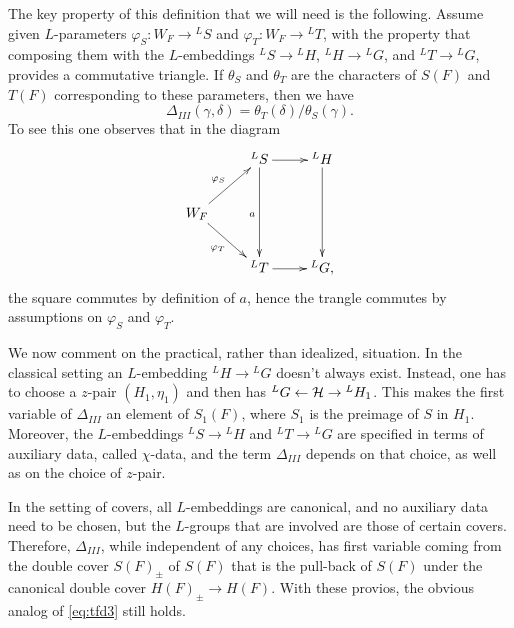 \documentclass{article}
\theoremstyle{definition}
\numberwithin{equation}{section}
\renewcommand{\-}{\hyp{}}
\begin{document}
The key property of this definition that we will need is the following. Assume given $L$\-parameters $\varphi_S : W_F \to {^LS}$ and $\varphi_T : W_F \to {^LT}$, with the property that composing them with the $L$\-embeddings $^LS \to {^LH}$, $^LH \to {^LG}$, and $^LT \to {^LG}$, provides a commutative triangle. If $\theta_S$ and $\theta_T$ are the characters of $S(F)$ and $T(F)$ corresponding to these parameters, then we have
\begin{equation} \label{eq:tfd3}
\Delta_{III}(\gamma,\delta) = \theta_T(\delta)/\theta_S(\gamma).	
\end{equation}
To see this one observes that in the diagram
\[ \xymatrix{
	&^LS\ar[dd]_a\ar[r]&^LH\ar[dd]\\
	W_F\ar[ru]^{\varphi_S}\ar[rd]_{\varphi_T}\\
	&^LT\ar[r]&^LG,
}
\]
the square commutes by definition of $a$, hence the trangle commutes by assumptions on $\varphi_S$ and $\varphi_T$.

We now comment on the practical, rather than idealized, situation. In the classical setting an $L$\-embedding $^LH \to {^LG}$ doesn't always exist. Instead, one has to choose a $z$-pair $(H_1,\eta_1)$ and then has $^LG \leftarrow \mathcal{H} \to {^LH_1}$. This makes the first variable of $\Delta_{III}$ an element of $S_1(F)$, where $S_1$ is the preimage of $S$ in $H_1$. Moreover, the $L$\-embeddings $^LS \to {^LH}$ and $^LT \to {^LG}$ are specified in terms of auxiliary data, called $\chi$-data, and the term $\Delta_{III}$ depends on that choice, as well as on the choice of $z$-pair.

In the setting of covers, all $L$\-embeddings are canonical, and no auxiliary data need to be chosen, but the $L$\-groups that are involved are those of certain covers. Therefore, $\Delta_{III}$, while independent of any choices, has first variable coming from the double cover $S(F)_\pm$ of $S(F)$ that is the pull-back of $S(F)$ under the canonical double cover $H(F)_\pm \to H(F)$. With these provios, the obvious analog of \eqref{eq:tfd3} still holds.
\end{document}
